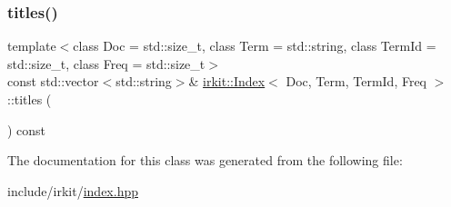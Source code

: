 \mbox{\label{classirkit_1_1Index_a632caff9525484c5d453d016c5cb586e}} 
\subsubsection{\texorpdfstring{titles()}{titles()}}
{\footnotesize\ttfamily template$<$class Doc  = std\+::size\+\_\+t, class Term  = std\+::string, class Term\+Id  = std\+::size\+\_\+t, class Freq  = std\+::size\+\_\+t$>$ \\
const std\+::vector$<$std\+::string$>$\& \mbox{\hyperlink{classirkit_1_1Index}{irkit\+::\+Index}}$<$ Doc, Term, Term\+Id, Freq $>$\+::titles (\begin{DoxyParamCaption}{ }\end{DoxyParamCaption}) const\hspace{0.3cm}{\ttfamily [inline]}}



The documentation for this class was generated from the following file\+:\begin{DoxyCompactItemize}
\item 
include/irkit/\mbox{\hyperlink{irkit_2index_8hpp}{index.\+hpp}}\end{DoxyCompactItemize}
